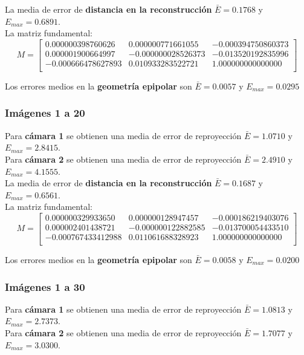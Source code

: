 \documentclass[a4paper, fontsize=11pt]{scrartcl} %
\numberwithin{equation}{section} %
\numberwithin{figure}{section} %
\numberwithin{table}{section} %
\begin{document}
	La media de error de \textbf{distancia en la reconstrucción} $\bar{E} = 0.1768$ y $E_{max} = 0.6891$.\\
	La matriz fundamental:
	\[
	M=
	\begin{bmatrix}
	0.000000398760626&	0.000000771661055&	-0.000394750860373 \\
	0.000001900664997&	-0.000000028526373&	-0.013520192835996 \\
	-0.000666478627893&	0.010933283522721&	1.000000000000000  \\
	
	\end{bmatrix}
	\]
	
	Los errores medios en la \textbf{geometría epipolar} son $\bar{E} = 0.0057$ y $E_{max} = 0.0295$
	
	\subsubsection*{Imágenes 1 a 20}
	
	Para \textbf{cámara 1} se obtienen una media de error de reproyección $\bar{E} = 1.0710$ y $E_{max} = 2.8415$.\\
	Para \textbf{cámara 2} se obtienen una media de error de reproyección $\bar{E} = 2.4910$ y $E_{max} = 4.1555$.\\
	
	La media de error de \textbf{distancia en la reconstrucción} $\bar{E} = 0.1687$ y $E_{max} = 0.6561$.\\
	La matriz fundamental:
	\[
	M=
	\begin{bmatrix}
	0.000000329933650&	0.000000128947457&	-0.000186219403076 \\
	0.000002401438721&	-0.000000122882585&	-0.013700054433510 \\
	-0.000767433412988&	0.011061688328923&	1.000000000000000  \\
	
	\end{bmatrix}
	\]
	
	Los errores medios en la \textbf{geometría epipolar} son $\bar{E} = 0.0058$ y $E_{max} = 0.0200$
	
	\subsubsection*{Imágenes 1 a 30}
	
	Para \textbf{cámara 1} se obtienen una media de error de reproyección $\bar{E} = 1.0813$ y $E_{max} = 2.7373$.\\
	Para \textbf{cámara 2} se obtienen una media de error de reproyección $\bar{E} = 1.7077$ y $E_{max} = 3.0300$.\\
	
\end{document}
